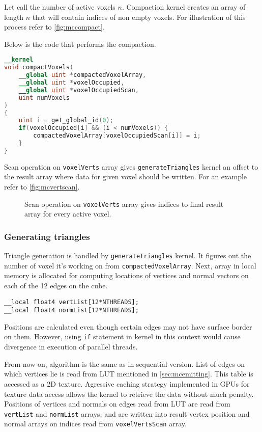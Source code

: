 Let call the number of active voxels $n$. Compaction kernel creates an array
of length $n$ that will contain indices of non empty voxels. For illustration of
this process refer to \autoref{fig:mccompact}.

Below is the code that performs the compaction.
\begin{lstlisting}[language=opencl]
__kernel
void compactVoxels(
	__global uint *compactedVoxelArray,
	__global uint *voxelOccupied,
	__global uint *voxelOccupiedScan,
	uint numVoxels
)
{
	uint i = get_global_id(0);
	if(voxelOccupied[i] && (i < numVoxels)) {
		compactedVoxelArray[voxelOccupiedScan[i]] = i;
	}
}
\end{lstlisting}

Scan operation on \texttt{voxelVerts} array gives \texttt{generateTriangles}
kernel an offset to the result array where data for given voxel should be written.
For an example refer to \autoref{fig:mcvertscan}.

\begin{figure}[htb]
	\begin{center}
		
	\end{center}
	\caption{Scan operation on \texttt{voxelVerts} array gives indices to
		final result array for every active voxel.
	}
	\label{fig:mcvertscan}
\end{figure}

\subsubsection{Generating triangles}

Triangle generation is handled by \texttt{generateTriangles} kernel. It figures
out the number of voxel it's working on from \texttt{compactedVoxelArray}. Next,
array in local memory is allocated for computing locations of vertices and normal
vectors on each of the 12 edges on the cube.

\begin{lstlisting}
__local float4 vertList[12*NTHREADS];
__local float4 normList[12*NTHREADS];
\end{lstlisting}

Positions are calculated even though certain edges may not have surface border
on them. However, using \texttt{if} statement in kernel in this context would
cause divergence in execution of parallel threads.

From now on, algorithm is the same as in sequential version. List of edges on
which vertices lie is read from LUT mentioned in \autoref{sec:mcemitting}. This
table is accessed as a 2D texture. Agressive caching strategy implemented in
GPUs for texture data access allows the kernel to retrieve the data without
much penalty. Positions of vertices and normals on edges read from LUT are read
from \texttt{vertList} and \texttt{normList} arrays, and are written into result
vertex position and normal arrays on indices read from \texttt{voxelVertsScan}
array.
